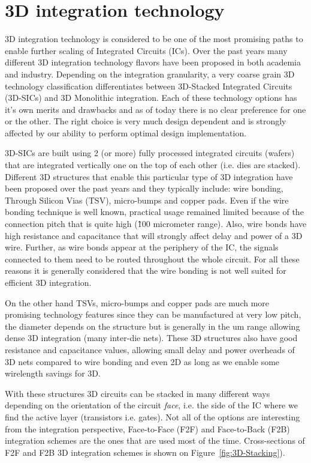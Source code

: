 \section{3D integration technology}
3D integration technology is considered to be one of the most promising paths to enable further scaling of Integrated Circuits (ICs). Over the past years many different 3D integration technology flavors have been proposed in both academia and industry. Depending on the integration granularity, a very coarse grain 3D technology classification differentiates between 3D-Stacked Integrated Circuits (3D-SICs) and 3D Monolithic integration. Each of these technology options has it's own merits and drawbacks and as of today there is no clear preference for one or the other. The right choice is very much design dependent and is strongly affected by our ability to perform optimal design implementation.

3D-SICs are built using 2 (or more) fully processed integrated circuits (wafers) that are integrated vertically one on the top of each other (i.e. dies are stacked). Different 3D structures that enable this particular type of 3D integration have been proposed over the past years and they typically include: wire bonding, Through Silicon Vias (TSV), micro-bumps and copper pads. Even if the wire bonding technique is well known, practical usage remained limited because of the connection pitch that is quite high (\~100 micrometer range). Also, wire bonds have high resistance and capacitance that will strongly affect delay and power of a 3D wire. Further, as wire bonds appear at the periphery of the IC, the signals connected to them need to be routed throughout the whole circuit. For all these reasons it is generally considered that the wire bonding is not well suited for efficient 3D integration.

On the other hand TSVs, micro-bumps and copper pads are much more promising technology features since they can be manufactured at very low pitch, the diameter depends on the structure but is generally in the um range allowing dense 3D integration (many inter-die nets). These 3D structures also have good resistance and capacitance values, allowing small delay and power overheads of 3D nets compared to wire bonding and even 2D as long as we enable some wirelength savings for 3D.

With these structures 3D circuits can be stacked in many different ways depending on the orientation of the circuit \emph{face}, i.e. the side of the IC where we find the active layer (transistors i.e. gates). Not all of the options are interesting from the integration perspective, Face-to-Face (F2F) and Face-to-Back (F2B) integration schemes are the ones that are used most of the time. Cross-sections of F2F and F2B 3D integration schemes is shown on Figure~\ref{fig:3D-Stacking}).

